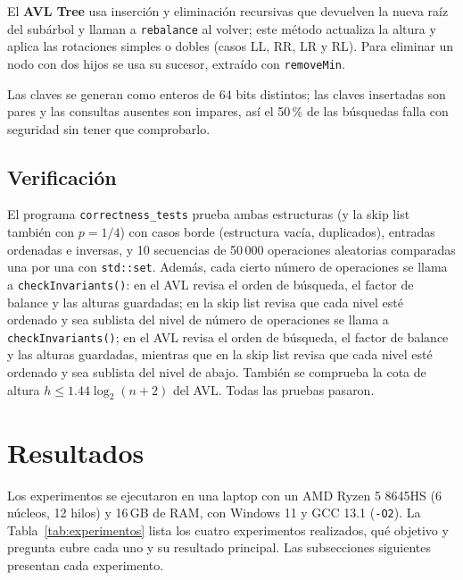\documentclass[11pt,a4paper]{article}
\begin{document}
El \textbf{AVL Tree} usa inserción y eliminación recursivas que devuelven la
nueva raíz del subárbol y llaman a \texttt{rebalance} al volver; este método
actualiza la altura y aplica las rotaciones simples o dobles (casos LL, RR, LR
y RL). Para eliminar un nodo con dos hijos se usa su sucesor, extraído con
\texttt{removeMin}.

Las claves se generan como enteros de 64 bits distintos; las claves
insertadas son pares y las consultas ausentes son impares, así el 50\,\% de
las búsquedas falla con seguridad sin tener que comprobarlo.

\subsection{Verificación}

El programa \texttt{correctness\_tests} prueba ambas estructuras (y la skip
list también con $p = 1/4$) con casos borde (estructura vacía, duplicados),
entradas ordenadas e inversas, y 10 secuencias de 50\,000 operaciones
aleatorias comparadas una por una con \texttt{std::set}. Además, cada cierto
número de operaciones se llama a \texttt{checkInvariants()}: en el AVL revisa
el orden de búsqueda, el factor de balance y las alturas guardadas; en la
skip list revisa que cada nivel esté ordenado y sea sublista del nivel de
número de operaciones se llama a \texttt{checkInvariants()}; en el AVL revisa
el orden de búsqueda, el factor de balance y las alturas guardadas, mientras que
en la skip list revisa que cada nivel esté ordenado y sea sublista del nivel de
abajo. También se comprueba la cota de altura
$h \le 1.44 \log_2(n+2)$ del AVL. Todas las pruebas pasaron.

\section{Resultados}\label{sec:resultados}

Los experimentos se ejecutaron en una laptop con un AMD Ryzen 5 8645HS (6
núcleos, 12 hilos) y 16\,GB de RAM, con Windows 11 y GCC 13.1 (\texttt{-O2}).
La Tabla~\ref{tab:experimentos} lista los cuatro experimentos realizados, qué
objetivo y pregunta cubre cada uno y su resultado principal. Las subsecciones
siguientes presentan cada experimento.
\end{document}

